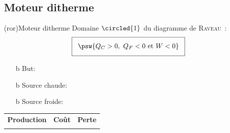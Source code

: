\documentclass[../../main/main.tex]{subfiles}
\begin{document}
\subsection{Moteur ditherme}
\begin{tcb*}[sidebyside](ror){Moteur ditherme}
	Domaine $\circled{1}$ du diagramme de \textsc{Raveau}~:
	\begin{gather*}
		\setlength{\fboxsep}{3mm}
		\boxed{\psw{Q_C > 0,~Q_F < 0 \text{~et~} W < 0}}
	\end{gather*}
	\begin{itemize}
		\item[b]{But}: 
		\item[b]{\color{red}Source chaude}: 
		\item[b]{\color{blue}Source froide}: 
	\end{itemize}
	\begin{tabularx}{\linewidth}{YYY}
		\textbf{Production} &
		\textbf{Coût}       &
		\textbf{Perte}
		\\
		          &
		         &
	\end{tabularx}
	\tcblower
	\begin{center}
		\vspace{-15pt}
	\end{center}
\end{tcb*}
\end{document}
